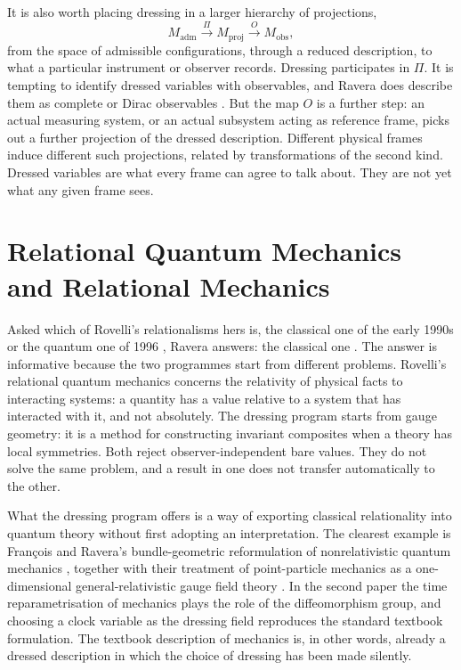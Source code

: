 \documentclass[11pt]{article}
\theoremstyle{plain}
\theoremstyle{definition}
\theoremstyle{remark}
\begin{document}
It is also worth placing dressing in a larger hierarchy of projections,
\begin{equation}
M_{\mathrm{adm}}\xrightarrow{\;\Pi\;}M_{\mathrm{proj}}\xrightarrow{\;O\;}M_{\mathrm{obs}},
\end{equation}
from the space of admissible configurations, through a reduced description, to what a particular instrument or observer records. Dressing participates in $\Pi$. It is tempting to identify dressed variables with observables, and Ravera does describe them as complete or Dirac observables \cite{toe}. But the map $O$ is a further step: an actual measuring system, or an actual subsystem acting as reference frame, picks out a further projection of the dressed description. Different physical frames induce different such projections, related by transformations of the second kind. Dressed variables are what every frame can agree to talk about. They are not yet what any given frame sees.

\section{Relational Quantum Mechanics and Relational Mechanics}\label{sec:rqm}

Asked which of Rovelli's relationalisms hers is, the classical one of the early 1990s \cite{rovelli-observable} or the quantum one of 1996 \cite{rovelli-rqm}, Ravera answers: the classical one \cite{toe}. The answer is informative because the two programmes start from different problems. Rovelli's relational quantum mechanics concerns the relativity of physical facts to interacting systems: a quantity has a value relative to a system that has interacted with it, and not absolutely. The dressing program starts from gauge geometry: it is a method for constructing invariant composites when a theory has local symmetries. Both reject observer-independent bare values. They do not solve the same problem, and a result in one does not transfer automatically to the other.

What the dressing program offers is a way of exporting classical relationality into quantum theory without first adopting an interpretation. The clearest example is François and Ravera's bundle-geometric reformulation of nonrelativistic quantum mechanics \cite{fr-qm}, together with their treatment of point-particle mechanics as a one-dimensional general-relativistic gauge field theory \cite{fr-mech}. In the second paper the time reparametrisation of mechanics plays the role of the diffeomorphism group, and choosing a clock variable as the dressing field reproduces the standard textbook formulation. The textbook description of mechanics is, in other words, already a dressed description in which the choice of dressing has been made silently.
\end{document}
